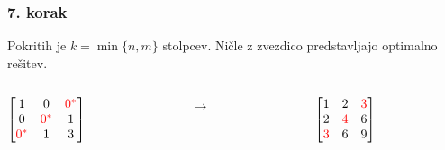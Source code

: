 \documentclass{beamer}
\begin{document}
\begin{frame}
    \frametitle{7. korak}
    \begin{block}{}
        Pokritih je $k = \min\{n,m\}$ stolpcev. Ničle z zvezdico predstavljajo 
        optimalno rešitev.
    \end{block}
    \hfill
    \begin{columns}[t]
        \begin{column}{0.25\linewidth}
            $\begin{bmatrix}
                1 & 0 & \textcolor{red}{0^{*}}\\
               0 & \textcolor{red}{0^{*}}& 1\\
               \textcolor{red}{0^{*}} & 1 & 3\\	
           \end{bmatrix}$
        \end{column}
        \begin{column}{0.25\linewidth}
         \centering
         $ \rightarrow $
        \end{column}
        \hfill
        \begin{column}{0.25\linewidth}
            \centering
            $\begin{bmatrix}
                1 & 2 & \textcolor{red}{3}\\
               2 & \textcolor{red}{4}& 6\\
               \textcolor{red}{3} & 6 & 9\\	
           \end{bmatrix}$
        \end{column}
    \end{columns}
\end{frame}
\end{document}
